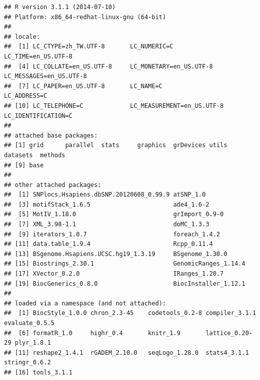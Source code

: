 \documentclass[a4paper,10pt]{article}\usepackage[]{graphicx}\usepackage[]{color}
\makeatletter
\newenvironment{kframe}{%
 \def\at@end@of@kframe{}%
 \ifinner\ifhmode%
  \def\at@end@of@kframe{\end{minipage}}%
  \begin{minipage}{\columnwidth}%
 \fi\fi%
 \def\FrameCommand##1{\hskip\@totalleftmargin \hskip-\fboxsep
 \colorbox{shadecolor}{##1}\hskip-\fboxsep
     \hskip-\linewidth \hskip-\@totalleftmargin \hskip\columnwidth}%
 \MakeFramed {\advance\hsize-\width
   \@totalleftmargin\z@ \linewidth\hsize
   \@setminipage}}%
 {\par\unskip\endMakeFramed%
 \at@end@of@kframe}
\newenvironment{knitrout}{}{} %
\makeatother
\begin{document}
\begin{knitrout}
\color{fgcolor}\begin{kframe}
\begin{verbatim}
## R version 3.1.1 (2014-07-10)
## Platform: x86_64-redhat-linux-gnu (64-bit)
## 
## locale:
##  [1] LC_CTYPE=zh_TW.UTF-8       LC_NUMERIC=C               LC_TIME=en_US.UTF-8       
##  [4] LC_COLLATE=en_US.UTF-8     LC_MONETARY=en_US.UTF-8    LC_MESSAGES=en_US.UTF-8   
##  [7] LC_PAPER=en_US.UTF-8       LC_NAME=C                  LC_ADDRESS=C              
## [10] LC_TELEPHONE=C             LC_MEASUREMENT=en_US.UTF-8 LC_IDENTIFICATION=C       
## 
## attached base packages:
## [1] grid      parallel  stats     graphics  grDevices utils     datasets  methods  
## [9] base     
## 
## other attached packages:
##  [1] SNPlocs.Hsapiens.dbSNP.20120608_0.99.9 atSNP_1.0                             
##  [3] motifStack_1.6.5                       ade4_1.6-2                            
##  [5] MotIV_1.18.0                           grImport_0.9-0                        
##  [7] XML_3.98-1.1                           doMC_1.3.3                            
##  [9] iterators_1.0.7                        foreach_1.4.2                         
## [11] data.table_1.9.4                       Rcpp_0.11.4                           
## [13] BSgenome.Hsapiens.UCSC.hg19_1.3.19     BSgenome_1.30.0                       
## [15] Biostrings_2.30.1                      GenomicRanges_1.14.4                  
## [17] XVector_0.2.0                          IRanges_1.20.7                        
## [19] BiocGenerics_0.8.0                     BiocInstaller_1.12.1                  
## 
## loaded via a namespace (and not attached):
##  [1] BiocStyle_1.0.0 chron_2.3-45    codetools_0.2-8 compiler_3.1.1  evaluate_0.5.5 
##  [6] formatR_1.0     highr_0.4       knitr_1.9       lattice_0.20-29 plyr_1.8.1     
## [11] reshape2_1.4.1  rGADEM_2.10.0   seqLogo_1.28.0  stats4_3.1.1    stringr_0.6.2  
## [16] tools_3.1.1
\end{verbatim}
\end{kframe}
\end{knitrout}


%
%



\end{document}
